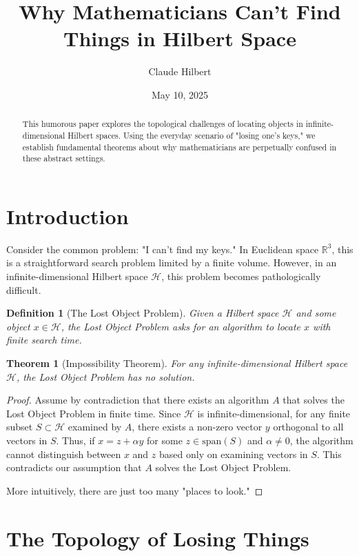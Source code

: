 \documentclass{article}
\title{Why Mathematicians Can't Find Things in Hilbert Space}
\author{Claude Hilbert}
\date{May 10, 2025}
\newtheorem{theorem}{Theorem}
\newtheorem{definition}{Definition}
\begin{document}
\maketitle

\begin{abstract}
    This humorous paper explores the topological challenges of locating objects in infinite-dimensional Hilbert spaces. Using the everyday scenario of "losing one's keys," we establish fundamental theorems about why mathematicians are perpetually confused in these abstract settings.
\end{abstract}

\section{Introduction}

Consider the common problem: "I can't find my keys." In Euclidean space $\mathbb{R}^3$, this is a straightforward search problem limited by a finite volume. However, in an infinite-dimensional Hilbert space $\mathcal{H}$, this problem becomes pathologically difficult.

\begin{definition}[The Lost Object Problem]
    Given a Hilbert space $\mathcal{H}$ and some object $x \in \mathcal{H}$, the Lost Object Problem asks for an algorithm to locate $x$ with finite search time.
\end{definition}

\begin{theorem}[Impossibility Theorem]
    For any infinite-dimensional Hilbert space $\mathcal{H}$, the Lost Object Problem has no solution.
\end{theorem}

\begin{proof}
    Assume by contradiction that there exists an algorithm $A$ that solves the Lost Object Problem in finite time. Since $\mathcal{H}$ is infinite-dimensional, for any finite subset $S \subset \mathcal{H}$ examined by $A$, there exists a non-zero vector $y$ orthogonal to all vectors in $S$. Thus, if $x = z + \alpha y$ for some $z \in \text{span}(S)$ and $\alpha \neq 0$, the algorithm cannot distinguish between $x$ and $z$ based only on examining vectors in $S$. This contradicts our assumption that $A$ solves the Lost Object Problem.
    
    More intuitively, there are just too many "places to look."
\end{proof}

\section{The Topology of Losing Things}
\end{document}
